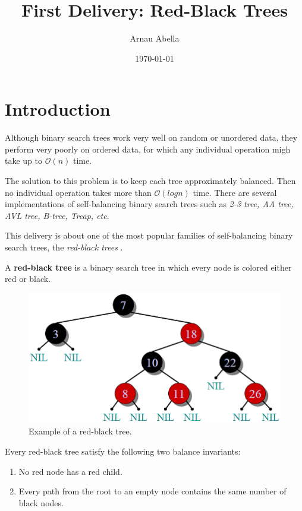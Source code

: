\documentclass[12pt, a4paper]{article} %
\title{First Delivery: Red-Black Trees}
\author{Arnau Abella}
\date{\today}
\begin{document}
\maketitle

\section{Introduction}\label{s:introduction}

Although binary search trees work very well on random or unordered data, they perform very poorly on ordered data, for which any individual operation migh take up to $\mathcal{O}(n)$ time.

The solution to this problem is to keep each tree approximately balanced. Then no individual operation takes more than $\mathcal{O}(log n)$ time. There are several implementations of self-balancing binary search trees such as \textit{2-3 tree, AA tree, AVL tree, B-tree, Treap, etc}.

This delivery is about one of the most popular families of self-balancing binary search trees, the \textit{red-black trees} \cite{gs78}.

A \textbf{red-black tree} is a binary search tree in which every node is colored either red or black.

\begin{figure}[H]
  \includegraphics[scale=0.5]{rbt}
  \centering
  \caption{Example of a red-black tree.}
  \label{fig:rbt}
\end{figure}

Every red-black tree satisfy the following two balance invariants:

\begin{enumerate}
  \item No red node has a red child. \label{inv1}
  \item Every path from the root to an empty node contains the same number of black nodes. \label{inv2}
\end{enumerate}
\end{document}
